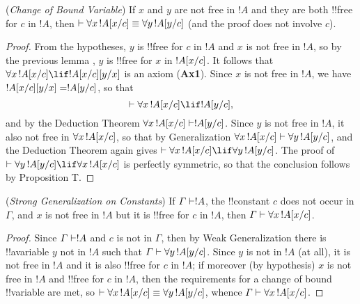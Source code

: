 \documentclass[../../include/open-logic-section]{subfiles}
\begin{document}
\begin{lem} (\emph{Change of Bound Variable}) If
$x$ and $y$ are not free in $!A$ and they are both !!{free for} $c$ in
$!A$, then $\Proves \lforall[x][\Subst{!A}{x}{c}] \equiv
\lforall[y][\Subst{!A}{y}{c}]$ (and the proof does not involve $c$).
\end{lem}

\begin{proof} From the hypotheses, $y$ is !!{free for} $c$ in $!A$ and $x$
is not free in $!A$, so by the previous lemma
, $y$ is !!{free for} $x$ in
$!A[x/c]$. It follows that $\lforall[x][\Subst{!A}{x}{c} \lif
\Subst{!A}{x}{c} \Subst{}{y}{x}]$ is an axiom (\textbf{Ax1}). Since $x$ is
not free in $!A$, we have $!A[x/c] [y/x] =
!A[y/c]$, so that \[ \Proves \lforall[x][\Subst{!A}{x}{c}] \lif
\Subst{!A}{y}{c}, \] and by the Deduction Theorem
$\lforall[x][\Subst{!A}{x}{c}] \Proves \Subst{!A}{y}{c}$. Since $y$ is not
free in $!A$, it also not free in $\lforall[x][\Subst{!A}{x}{c}]$, so that
by Generalization $\lforall[x][\Subst{!A}{x}{c}] \Proves
\lforall[y][\Subst{!A}{y}{c}]$, and the Deduction Theorem again gives
$\Proves \lforall[x][\Subst{!A}{x}{c}] \lif \lforall[y][\Subst{!A}{y}{c}]$.
The proof of $\Proves \lforall[y][\Subst{!A}{y}{c}] \lif \lforall[x]
[\Subst{!A}{x}{c}]$ is perfectly symmetric, so that the conclusion follows
by Proposition T. 
\end{proof}

\begin{thm} (\emph{Strong Generalization on
Constants}) If $\Gamma \Proves !A$, the !!{constant} $c$ does not occur in
$\Gamma$, and $x$ is not free in $!A$ but it is !!{free for} $c$ in $!A$,
then $\Gamma \Proves \lforall[x][\Subst{!A}{x}{c}]$. 
\end{thm}

\begin{proof} Since $\Gamma \Proves !A$ and $c$ is not in $\Gamma$, then by
Weak Generalization there is !!a{variable} $y$ not in $!A$ such that
$\Gamma \Proves \lforall[y][\Subst{!A}{y}{c}]$. Since $y$ is not in $!A$
(at all), it is not free in $!A$ and it is also !!{free for} $c$ in $!A$;
if moreover (by hypothesis) $x$ is not free in $!A$ and !!{free for} $c$ in
$!A$, then the requirements for a change of bound !!{variable} are met, so
$\Proves \lforall[x][\Subst{!A}{x}{c}] \equiv
\lforall[y][\Subst{!A}{y}{c}]$, whence $\Gamma \Proves
\lforall[x][\Subst{!A}{x}{c}]$. 
\end{proof}
\end{document}
